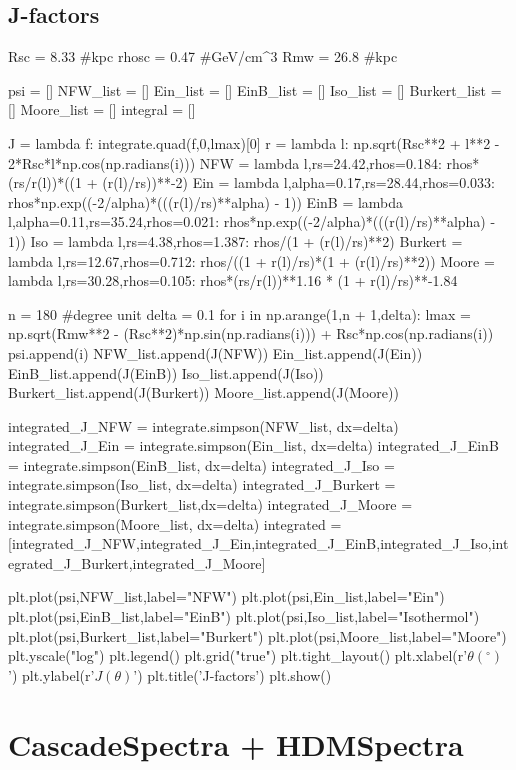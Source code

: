\documentclass[10pt, oneside]{book}
\numberwithin{equation}{chapter}
\begin{document}
\subsection{J-factors}
\begin{python}
Rsc = 8.33 #kpc
rhosc = 0.47 #GeV/cm^3
Rmw = 26.8 #kpc

psi = []
NFW_list = []
Ein_list = []
EinB_list = []
Iso_list = []
Burkert_list = []
Moore_list = []
integral = []

J = lambda f: integrate.quad(f,0,lmax)[0]
r = lambda l: np.sqrt(Rsc**2 + l**2 - 2*Rsc*l*np.cos(np.radians(i)))
NFW = lambda l,rs=24.42,rhos=0.184: rhos*(rs/r(l))*((1 + (r(l)/rs))**-2)
Ein = lambda l,alpha=0.17,rs=28.44,rhos=0.033: rhos*np.exp((-2/alpha)*(((r(l)/rs)**alpha) - 1))
EinB = lambda l,alpha=0.11,rs=35.24,rhos=0.021: rhos*np.exp((-2/alpha)*(((r(l)/rs)**alpha) - 1))
Iso = lambda l,rs=4.38,rhos=1.387: rhos/(1 + (r(l)/rs)**2)
Burkert = lambda l,rs=12.67,rhos=0.712: rhos/((1 + r(l)/rs)*(1 + (r(l)/rs)**2))
Moore = lambda l,rs=30.28,rhos=0.105: rhos*(rs/r(l))**1.16 * (1 + r(l)/rs)**-1.84

n = 180 #degree unit
delta = 0.1
for i in np.arange(1,n + 1,delta):
  lmax = np.sqrt(Rmw**2 - (Rsc**2)*np.sin(np.radians(i))) + Rsc*np.cos(np.radians(i))
  psi.append(i)
  NFW_list.append(J(NFW))
  Ein_list.append(J(Ein))
  EinB_list.append(J(EinB))
  Iso_list.append(J(Iso))
  Burkert_list.append(J(Burkert))
  Moore_list.append(J(Moore))

integrated_J_NFW = integrate.simpson(NFW_list, dx=delta)
integrated_J_Ein = integrate.simpson(Ein_list, dx=delta)
integrated_J_EinB = integrate.simpson(EinB_list, dx=delta)
integrated_J_Iso = integrate.simpson(Iso_list, dx=delta)
integrated_J_Burkert = integrate.simpson(Burkert_list,dx=delta)
integrated_J_Moore = integrate.simpson(Moore_list, dx=delta)
integrated = [integrated_J_NFW,integrated_J_Ein,integrated_J_EinB,integrated_J_Iso,integrated_J_Burkert,integrated_J_Moore]

plt.plot(psi,NFW_list,label="NFW")
plt.plot(psi,Ein_list,label="Ein")
plt.plot(psi,EinB_list,label="EinB")
plt.plot(psi,Iso_list,label="Isothermol")
plt.plot(psi,Burkert_list,label="Burkert")
plt.plot(psi,Moore_list,label="Moore")
plt.yscale("log")
plt.legend()
plt.grid("true")
plt.tight_layout()
plt.xlabel(r'$\theta (^\circ)$')
plt.ylabel(r'$J(\theta)$')
plt.title('J-factors')
plt.show()
\end{python}

\section{CascadeSpectra + HDMSpectra}
\end{document}
